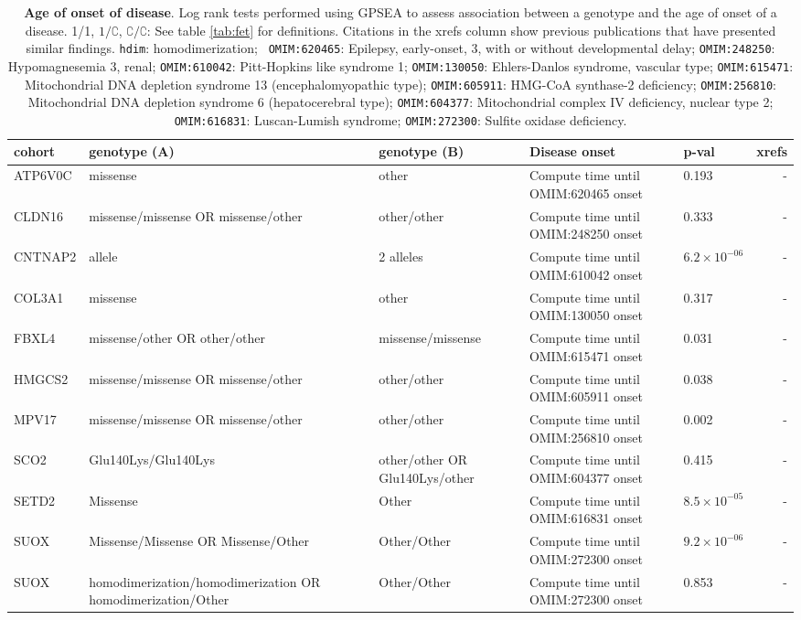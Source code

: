 \begin{table}
\centering
\begin{tabular}{l>{\raggedright\arraybackslash}p{4cm}p{2cm}>{\raggedright\arraybackslash}p{2.5cm}lr}
\toprule
\textbf{cohort} & \textbf{genotype (A)} & \textbf{genotype (B)} & \textbf{Disease onset} & \textbf{p-val} & \textbf{xrefs}\\
\midrule
ATP6V0C & missense & other & Compute time until OMIM:620465 onset & 0.193 & -\\
CLDN16 & missense/missense OR missense/other & other/other & Compute time until OMIM:248250 onset & 0.333 & -\\
CNTNAP2 & 1 allele & 2 alleles & Compute time until OMIM:610042 onset & $6.2 \times 10^{-06}$ & -\\
COL3A1 & missense & other & Compute time until OMIM:130050 onset & 0.317 & -\\
FBXL4 & missense/other OR other/other & missense/missense & Compute time until OMIM:615471 onset & 0.031 & -\\
HMGCS2 & missense/missense OR missense/other & other/other & Compute time until OMIM:605911 onset & 0.038 & -\\
MPV17 & missense/missense OR missense/other & other/other & Compute time until OMIM:256810 onset & 0.002 & -\\
SCO2 & Glu140Lys/Glu140Lys & other/other OR Glu140Lys/other & Compute time until OMIM:604377 onset & 0.415 & -\\
SETD2 & Missense & Other & Compute time until OMIM:616831 onset & $8.5 \times 10^{-05}$ & -\\
SUOX & Missense/Missense OR Missense/Other & Other/Other & Compute time until OMIM:272300 onset & $9.2 \times 10^{-06}$ & -\\
SUOX & homodimerization/homodimerization OR homodimerization/Other & Other/Other & Compute time until OMIM:272300 onset & 0.853 & -\\
\bottomrule
\end{tabular}
\caption{\textbf{Age of onset of disease}. Log rank tests performed using GPSEA to assess association between a genotype and the age of onset of a disease. 1/1, $1/\complement$, $\complement/\complement$: See table \ref{tab:fet} for definitions. Citations in the xrefs column show previous publications that have presented similar findings. \texttt{hdim}: homodimerization;
   \texttt{ OMIM:620465}: Epilepsy, early-onset, 3, with or without developmental delay; 
   \texttt{OMIM:248250}: Hypomagnesemia 3, renal;
   \texttt{OMIM:610042}: Pitt-Hopkins like syndrome 1;
   \texttt{OMIM:130050}: Ehlers-Danlos syndrome, vascular type;
   \texttt{OMIM:615471}: Mitochondrial DNA depletion syndrome 13 (encephalomyopathic type);
   \texttt{OMIM:605911}:  HMG-CoA synthase-2 deficiency;
   \texttt{OMIM:256810}: Mitochondrial DNA depletion syndrome 6 (hepatocerebral type);
   \texttt{OMIM:604377}: Mitochondrial complex IV deficiency, nuclear type 2;
   \texttt{OMIM:616831}: Luscan-Lumish syndrome;
  \texttt{OMIM:272300}: Sulfite oxidase deficiency.
}
\label{tab:disease_onset}
\end{table}

